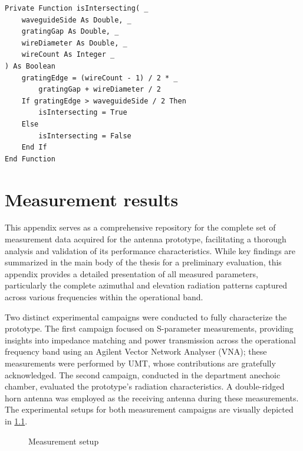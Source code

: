 \documentclass[11pt,a4paper,twoside,openany]{report}
\newlength{\twosubht}
\begin{document}
\begin{lstlisting}[caption={Check for intersection with waveguide walls}, label={lst:is-intersecting}, language=VBScript]
Private Function isIntersecting( _
    waveguideSide As Double, _
    gratingGap As Double, _
    wireDiameter As Double, _
    wireCount As Integer _
) As Boolean
    gratingEdge = (wireCount - 1) / 2 * _
        gratingGap + wireDiameter / 2
    If gratingEdge > waveguideSide / 2 Then
        isIntersecting = True
    Else
        isIntersecting = False
    End If
End Function
\end{lstlisting}

\chapter{Measurement results}
\label{appendix:measurement-results}
This appendix serves as a comprehensive repository for the complete set of measurement data acquired for the antenna prototype, facilitating a thorough analysis and validation of its performance characteristics. While key findings are summarized in the main body of the thesis for a preliminary evaluation, this appendix provides a detailed presentation of all measured parameters, particularly the complete azimuthal and elevation radiation patterns captured across various frequencies within the operational band.

Two distinct experimental campaigns were conducted to fully characterize the prototype. The first campaign focused on S-parameter measurements, providing insights into impedance matching and power transmission across the operational frequency band using an Agilent Vector Network Analyser (VNA); these measurements were performed by UMT, whose contributions are gratefully acknowledged. The second campaign, conducted in the department anechoic chamber, evaluated the prototype's radiation characteristics. A double-ridged horn antenna was employed as the receiving antenna during these measurements. The experimental setups for both measurement campaigns are visually depicted in \cref{fig:measurement-setup}.

\begin{figure}[!ht]
    \sbox{}
    \setlength{\twosubht}{\ht\twosubbox}

    \centering
    \quad
    \caption{\label{fig:measurement-setup}Measurement setup}
\end{figure}
\end{document}
